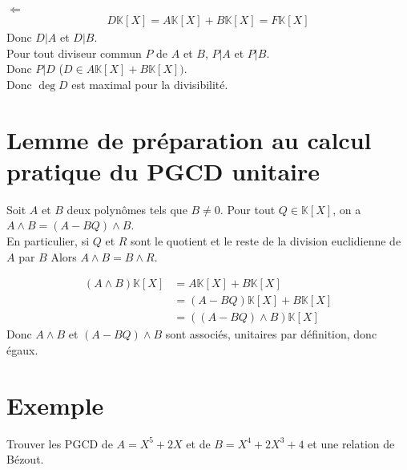 \documentclass[../main.tex]{subfiles}
\begin{document}
$\boxed{\Leftarrow}$ \\
\begin{align*}
    D \mathbb{K}[X] = A \mathbb{K}[X] + B \mathbb{K}[X] = F \mathbb{K}[X]
\end{align*}
Donc $D|A$ et $D|B$. \\
Pour tout diviseur commun $P$ de $A$ et $B$, $P|A$ et $P|B$. \\
Donc $P|D$ ($D \in A \mathbb{K}[X] + B \mathbb{K}[X])$. \\
Donc $\deg D$ est maximal pour la divisibilité. 

\setcounter{section}{23}
\section{Lemme de préparation au calcul pratique du PGCD unitaire}
\begin{tcolorbox}[title=Lemme 16.24, title filled=false, colframe=orange, colback=orange!10!white]
    Soit $A$ et $B$ deux polynômes tels que $B \neq 0$. Pour tout $Q \in \mathbb{K}[X]$, on a $A \wedge B = (A - BQ) \wedge B$. \\
    En particulier, si $Q$ et $R$ sont le quotient et le reste de la division euclidienne de $A$ par $B$ Alors $A \wedge B = B \wedge R$.
\end{tcolorbox}

\begin{align*}
    (A \wedge B) \mathbb{K}[X] &= A \mathbb{K}[X] + B \mathbb{K}[X] \\
    &= (A - BQ) \mathbb{K}[X] + B \mathbb{K}[X] \\
    &= ((A - BQ) \wedge B) \mathbb{K}[X]
\end{align*}
Donc $A \wedge B$ et $(A - BQ) \wedge B$ sont associés, unitaires par définition, donc égaux. 

\section{Exemple}
\begin{tcolorbox}[title=Exemple alternatif 16.26, title filled=false, colframe=darkgreen, colback=darkgreen!10!white]
    Trouver les PGCD de $A = X^5 + 2X$ et de $B = X^4 + 2X^3 + 4$ et une relation de Bézout. 
\end{tcolorbox}
\end{document}
